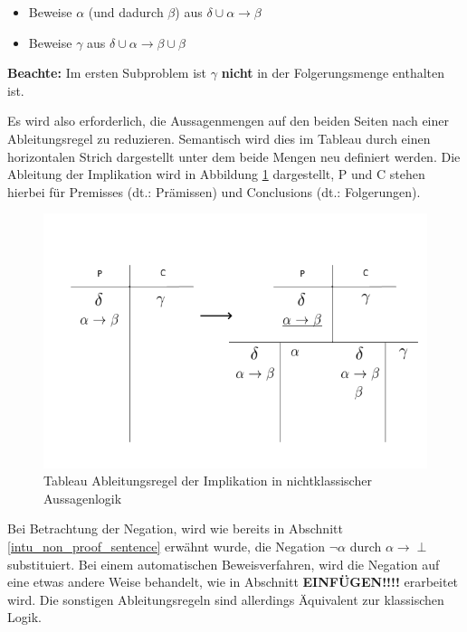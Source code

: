 \begin{itemize}
\item Beweise $\alpha$ (und dadurch $\beta$) aus $\delta\cup\alpha\rightarrow\beta$

\item Beweise $\gamma$ aus $\delta\cup\alpha\rightarrow\beta\cup\beta$
\end{itemize}

\textbf{Beachte:} Im ersten Subproblem ist $\gamma$ \textbf{nicht} in der Folgerungsmenge enthalten ist.

Es wird also erforderlich, die Aussagenmengen auf den beiden Seiten nach einer Ableitungsregel zu reduzieren. Semantisch wird dies im Tableau durch einen horizontalen Strich dargestellt unter dem beide Mengen neu definiert werden. Die Ableitung der Implikation wird in Abbildung \ref{tableaux_impl_ipc} dargestellt, P und C stehen hierbei für Premisses (dt.: Prämissen) und Conclusions (dt.: Folgerungen).

\begin{figure}[h]
\begin{center}
\includegraphics[scale=0.7]{images/Tableaux_Impl_IPC.png}
\caption{Tableau Ableitungsregel der Implikation in nichtklassischer Aussagenlogik}
\label{tableaux_impl_ipc}
\end{center}
\end{figure}

Bei Betrachtung der Negation, wird wie bereits in Abschnitt \ref{intu_non_proof_sentence} erwähnt wurde, die Negation $\neg\alpha$ durch $\alpha\rightarrow\perp$ substituiert. Bei einem automatischen Beweisverfahren, wird die Negation auf eine etwas andere Weise behandelt, wie in Abschnitt \textbf{EINFÜGEN!!!!} erarbeitet wird. Die sonstigen Ableitungsregeln sind allerdings Äquivalent zur klassischen Logik.

